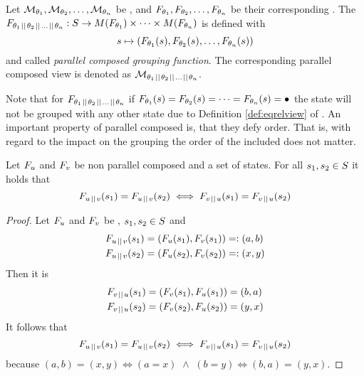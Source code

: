 \documentclass[preview]{standalone}
\begin{document}
\begin{definition} \label{def:pllcompviewandgfct}
	Let $\view[\viewppty_1], \view[\viewppty_2], \dots, \view[\viewppty_n]$ be \viewsN, and $\grpfct[\viewppty_1], \grpfct[\viewppty_2], \dots, \grpfct[\viewppty_n]$ be their corresponding \grpfctsN. The \grpfctN $\grpfct[{\viewppty_1 \pll \viewppty_2 \pll \dots \pll \viewppty_n}]: \states \to \arbset(\grpfct[\viewppty_1]) \times \dots \times \arbset(\grpfct[\viewppty_n])$ is defined with
	\[
	\state \mapsto (\grpfct[\viewppty_1](\state), \grpfct[\viewppty_2](\state), \dots, \grpfct[\viewppty_n](\state))
	\] 
	and called \emph{parallel composed grouping function}.
	The corresponding parallel composed view is denoted as $\view[\viewppty_1 \pll \viewppty_2 \pll \dots \pll \viewppty_n]$.
\end{definition}

Note that for $\grpfct[{\viewppty_1 \pll \viewppty_2 \pll \dots \pll \viewppty_n}]$ if $\grpfct[\viewppty_1](\state) = \grpfct[\viewppty_2](\state) = \dots = \grpfct[\viewppty_n](\state) = \remelem$ the state \state will not be grouped with any other state due to Definition \ref{def:eqrelview} of \eqrelview. An important property of parallel composed \grpfctsN is, that they defy order. That is, with regard to the impact on the grouping the order of the included \grpfctsN does not matter.

\begin{proposition}
	Let $\grpfct[u]$ and $\grpfct[v]$ be non parallel composed \grpfctsN and \states a set of states. For all $\state_1, \state_2 \in \states$ it holds that
	\[
	\grpfct[u \pll v](\state_1) = \grpfct[u \pll v](\state_2) \iff \grpfct[v \pll u](\state_1) = \grpfct[v \pll u](\state_2)
	\]
\end{proposition}

\begin{proof}
	Let $\grpfct[u]$ and $\grpfct[v]$ be \grpfctsN, $\state_1, \state_2 \in \states$ and
	\begin{align*}
		\grpfct[u \pll v](\state_1) &= (\grpfct[u](\state_1), \grpfct[v](\state_1)) =: (a, b) \\
		\grpfct[u \pll v](\state_2) &= (\grpfct[u](\state_2), \grpfct[v](\state_2)) =: (x, y)			
	\end{align*}
	Then it is
	\begin{align*}
		\grpfct[v \pll u](\state_1) &= (\grpfct[v](\state_1), \grpfct[u](\state_1)) = (b, a) \\
		\grpfct[v \pll u](\state_2) &= (\grpfct[v](\state_2), \grpfct[u](\state_2)) = (y, x)
	\end{align*}
	It follows that
	\[
	\grpfct[u \pll v](\state_1) = \grpfct[u \pll v](\state_2) \iff \grpfct[v \pll u](\state_1) = \grpfct[v \pll u](\state_2)
	\]
	because $(a, b) = (x, y) \iff (a = x) \,\, \land \,\, (b = y) \iff (b, a) = (y, x)$.
\end{proof}
\end{document}
